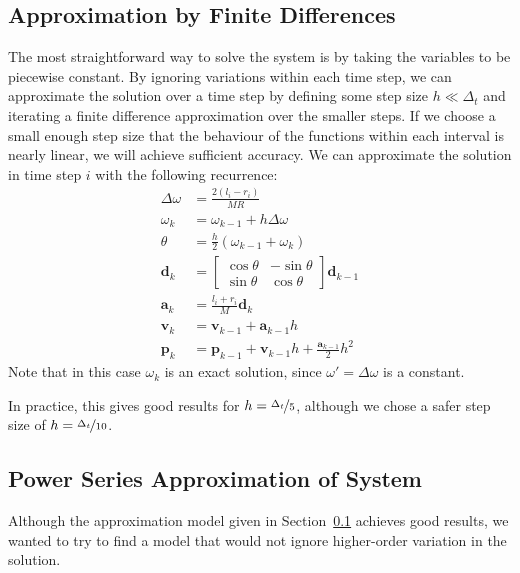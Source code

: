 \documentclass{report}
\begin{document}
\subsection{Approximation by Finite Differences} \label{sec:linearapprox}
The most straightforward way to solve the system is by taking the variables to be piecewise constant.
By ignoring
variations within each time step,
we can approximate the solution over a time step by defining some step size $h \ll \Delta_t$
and iterating a finite difference approximation over the smaller steps.
If we choose a small enough step size that the behaviour of the
functions within each interval is nearly linear, we will achieve sufficient accuracy. We can approximate
the solution in time step $i$ with the following recurrence:
\begin{align*}
    \Delta\omega &= \frac{2(l_i - r_i)}{MR} \\
    \omega_k &= \omega_{k-1} + h \Delta\omega \\
    \theta &= \frac{h}{2} (\omega_{k-1} + \omega_k) \\
    \mathbf{d}_k &= \begin{bmatrix}\cos \theta & -\sin \theta \\ \sin \theta & \cos \theta\end{bmatrix} \mathbf{d}_{k-1} \\
    \mathbf{a}_k &= \frac{l_i + r_i}{M} \mathbf{d}_{k} \\
    \mathbf{v}_k &= \mathbf{v}_{k-1} + \mathbf{a}_{k-1} h \\
    \mathbf{p}_k &= \mathbf{p}_{k-1} + \mathbf{v}_{k-1} h + \frac{\mathbf{a}_{k-1}}{2} h^2
\end{align*}
Note that in this case $\omega_k$ is an exact solution, since $\omega' = \Delta\omega$ is a constant.

In practice, this gives good results for $h = \nicefrac{\Delta_t}{5}$, although we chose a
safer step size of $h = \nicefrac{\Delta_t}{10}$.


\subsection{Power Series Approximation of System} \label{sec:power}
Although the approximation model given in Section~\ref{sec:linearapprox}
achieves good results, we wanted to try to find a model that would not ignore higher-order
variation in the solution.
\end{document}
